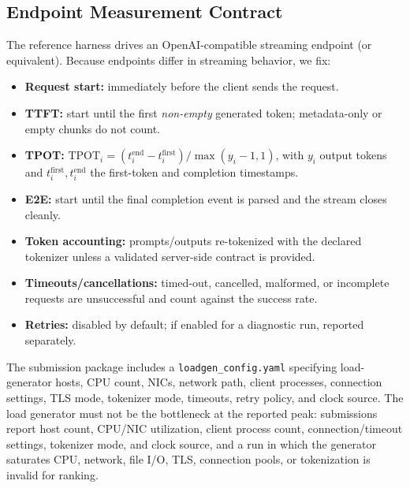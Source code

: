 \subsection{Endpoint Measurement Contract}
\label{subsec:endpoint_contract}
The reference harness drives an OpenAI-compatible streaming endpoint (or
equivalent). Because endpoints differ in streaming behavior, we fix:
\begin{itemize}
    \item \textbf{Request start:} immediately before the client sends the request.
    \item \textbf{TTFT:} start until the first \emph{non-empty} generated token; metadata-only or empty chunks do not count.
    \item \textbf{TPOT:} $\mathrm{TPOT}_i = (t^{\mathrm{end}}_i - t^{\mathrm{first}}_i)/\max(y_i-1,1)$, with $y_i$ output tokens and $t^{\mathrm{first}}_i,t^{\mathrm{end}}_i$ the first-token and completion timestamps.
    \item \textbf{E2E:} start until the final completion event is parsed and the stream closes cleanly.
    \item \textbf{Token accounting:} prompts/outputs re-tokenized with the declared tokenizer unless a validated server-side contract is provided.
    \item \textbf{Timeouts/cancellations:} timed-out, cancelled, malformed, or incomplete requests are unsuccessful and count against the success rate.
    \item \textbf{Retries:} disabled by default; if enabled for a diagnostic run, reported separately.
\end{itemize}
The submission package includes a \texttt{loadgen\_config.yaml} specifying
load-generator hosts, CPU count, NICs, network path, client processes, connection
settings, TLS mode, tokenizer mode, timeouts, retry policy, and clock source. The
load generator must not be the bottleneck at the reported peak: submissions report
host count, CPU/NIC utilization, client process count, connection/timeout settings,
tokenizer mode, and clock source, and a run in which the generator saturates CPU,
network, file I/O, TLS, connection pools, or tokenization is invalid for ranking.


